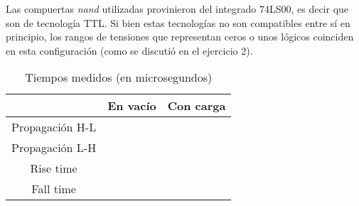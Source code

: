 \documentclass[../../e3_tp2_main.tex]{subfiles}
\begin{document}
Las compuertas \textit{nand} utilizadas provinieron del integrado 74LS00, es decir que son de tecnolog\'ia TTL. Si bien estas tecnolog\'ias no son compatibles entre s\'i en principio, los rangos de tensiones que representan ceros o unos l\'ogicos coinciden en esta configuraci\'on (como se discuti\'o en el ejercicio 2). 

\begin{table}[H]
	\centering
	\begin{tabular}{|c|c|c|}
	\hline
                  			& En vac\'io	& Con carga	\\ \hline \hline
	Propagaci\'on H-L	&         		&                      \\ \hline
	Propagaci\'on L-H 	&         		&                      \\ \hline
	Rise time         		&         		&                      \\ \hline
	Fall time         		&         		&                      \\ \hline
	\end{tabular}
	\caption{Tiempos medidos (en microsegundos)}
\end{table}
\end{document}

